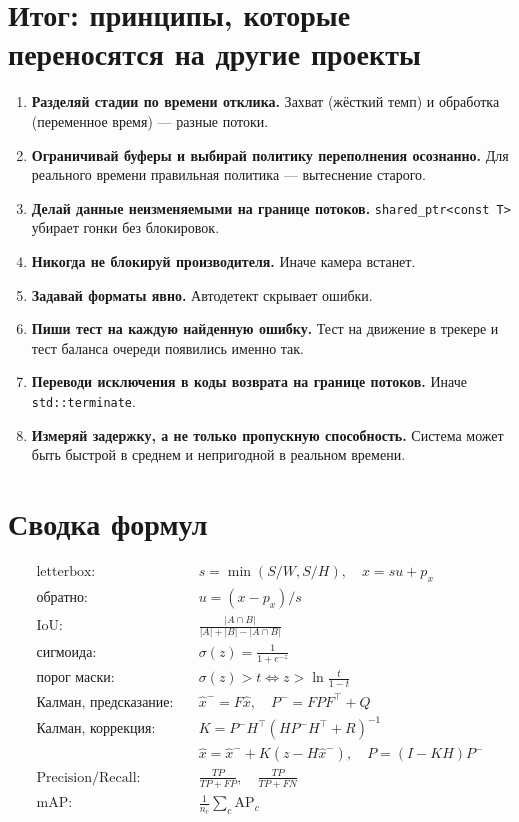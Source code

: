 \documentclass[11pt,a4paper]{article}
\theoremstyle{definition}
\theoremstyle{remark}
\begin{document}
\section{Итог: принципы, которые переносятся на другие проекты}

\begin{enumerate}
  \item \textbf{Разделяй стадии по времени отклика.} Захват (жёсткий темп)
        и обработка (переменное время) --- разные потоки.
  \item \textbf{Ограничивай буферы и выбирай политику переполнения осознанно.}
        Для реального времени правильная политика --- вытеснение старого.
  \item \textbf{Делай данные неизменяемыми на границе потоков.}
        \texttt{shared\_ptr<const T>} убирает гонки без блокировок.
  \item \textbf{Никогда не блокируй производителя.} Иначе камера встанет.
  \item \textbf{Задавай форматы явно.} Автодетект скрывает ошибки.
  \item \textbf{Пиши тест на каждую найденную ошибку.} Тест на движение в
        трекере и тест баланса очереди появились именно так.
  \item \textbf{Переводи исключения в коды возврата на границе потоков.}
        Иначе \texttt{std::terminate}.
  \item \textbf{Измеряй задержку, а не только пропускную способность.}
        Система может быть быстрой в среднем и непригодной в реальном времени.
\end{enumerate}

\appendix

\section{Сводка формул}

\begin{align}
  \text{letterbox:}\quad & s = \min(S/W, S/H), \quad x = su + p_x \\
  \text{обратно:}\quad & u = (x - p_x)/s \\
  \text{IoU:}\quad & \frac{|A \cap B|}{|A| + |B| - |A \cap B|} \\
  \text{сигмоида:}\quad & \sigma(z) = \frac{1}{1+e^{-z}} \\
  \text{порог маски:}\quad & \sigma(z) > t \iff z > \ln\frac{t}{1-t} \\
  \text{Калман, предсказание:}\quad & \hat{x}^- = F\hat{x}, \quad P^- = FPF^\top + Q \\
  \text{Калман, коррекция:}\quad & K = P^-H^\top(HP^-H^\top + R)^{-1} \\
  & \hat{x} = \hat{x}^- + K(z - H\hat{x}^-), \quad P = (I-KH)P^- \\
  \text{Precision/Recall:}\quad & \frac{TP}{TP+FP}, \quad \frac{TP}{TP+FN} \\
  \text{mAP:}\quad & \frac{1}{n_c}\sum_c \mathrm{AP}_c
\end{align}
\end{document}
